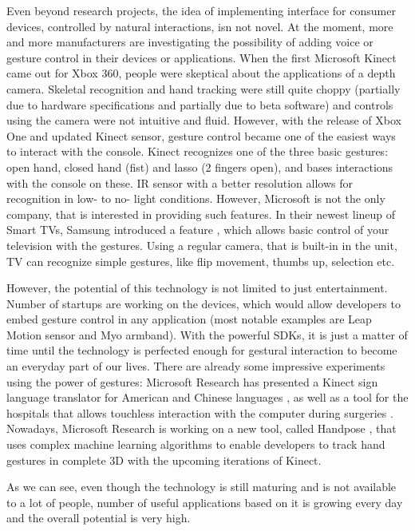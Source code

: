 \documentclass[a4paper,11pt,oneside]{article}
\begin{document}
Even beyond research projects, the idea of implementing interface for consumer devices, controlled by natural interactions, isn not novel. At the moment, more and more manufacturers are investigating the possibility of adding voice or gesture control in their devices or applications. When the first Microsoft Kinect came out for Xbox 360, people were skeptical about the applications of a depth camera. Skeletal recognition and hand tracking were still quite choppy (partially due to hardware specifications and partially due to beta software) and controls using the camera were not intuitive and fluid. However, with the release of Xbox One and updated Kinect sensor, gesture control became one of the easiest ways to interact with the console. Kinect recognizes one of the three basic gestures: open hand, closed hand (fist) and lasso (2 fingers open), and bases interactions with the console on these. IR sensor with a better resolution allows for recognition in low- to no- light conditions. However, Microsoft is not the only company, that is interested in providing such features. In their newest lineup of Smart TVs, Samsung introduced a feature \cite{SM01}, which allows basic control of your television with the gestures. Using a regular camera, that is built-in in the unit, TV can recognize simple gestures, like flip movement, thumbs up, selection etc.

However, the potential of this technology is not limited to just entertainment. Number of startups are working on the devices, which would allow developers to embed gesture control in any application (most notable examples are Leap Motion sensor and Myo armband). With the powerful SDKs, it is just a matter of time until the technology is perfected enough for gestural interaction to become an everyday part of our lives. There are already some impressive experiments using the power of gestures: Microsoft Research has presented a Kinect sign language translator for American and Chinese languages \cite{MS02}, as well as a tool for the hospitals that allows touchless interaction with the computer during surgeries \cite{MS03}. Nowadays, Microsoft Research is working on a new tool, called Handpose \cite{MS04}, that uses complex machine learning algorithms to enable developers to track hand gestures in complete 3D with the upcoming iterations of Kinect.

As we can see, even though the technology is still maturing and is not available to a lot of people, number of useful applications based on it is growing every day and the overall potential is very high.
\end{document}
